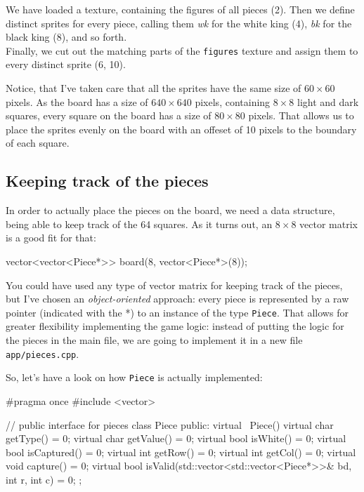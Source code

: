 We have loaded a texture, containing the figures of all pieces (2).
Then we define distinct sprites for every piece, calling them \emph{wk} for the white king (4),
\emph{bk} for the black king (8), and so forth.\\
Finally, we cut out the matching parts of the \texttt{figures} texture and assign
them to every distinct sprite (6, 10).


Notice, that I've taken care that all the sprites have the same size of
$60 \times 60$ pixels.
As the board has a size of $640 \times 640$ pixels, containing $8 \times 8$ light and dark squares,
every square on the board has a size of $80 \times 80$ pixels.
That allows us to place the sprites evenly on the board with an offeset of 10 pixels to the
boundary of each square.

\subsection{Keeping track of the pieces}
In order to actually place the pieces on the board, we need a data structure, being able to
keep track of the 64 squares.
As it turns out, an $8 \times 8$ vector matrix is a good fit for that:

\begin{cpp}
vector<vector<Piece*>> board(8, vector<Piece*>(8));
\end{cpp}

You could have used any type of vector matrix for keeping track of the pieces,
but I've chosen an \emph{object-oriented} approach:
every piece is represented by a raw pointer (indicated with the *) to an instance of the type
\texttt{Piece}.
That allows for greater flexibility implementing the game logic: instead of putting
the logic for the pieces in the main file, we are going to implement it in a new file
\texttt{app/pieces.cpp}.

So, let's have a look on how \texttt{Piece} is actually implemented:

\begin{cpp}
#pragma once
#include <vector>

// public interface for pieces
class Piece {
public:
  virtual ~Piece() {}
  virtual char getType() = 0;
  virtual char getValue() = 0;
  virtual bool isWhite() = 0;
  virtual bool isCaptured() = 0;
  virtual int getRow() = 0;
  virtual int getCol() = 0;
  virtual void capture() = 0;
  virtual bool isValid(std::vector<std::vector<Piece*>>& bd,
                       int r, int c) = 0;
};
\end{cpp}

